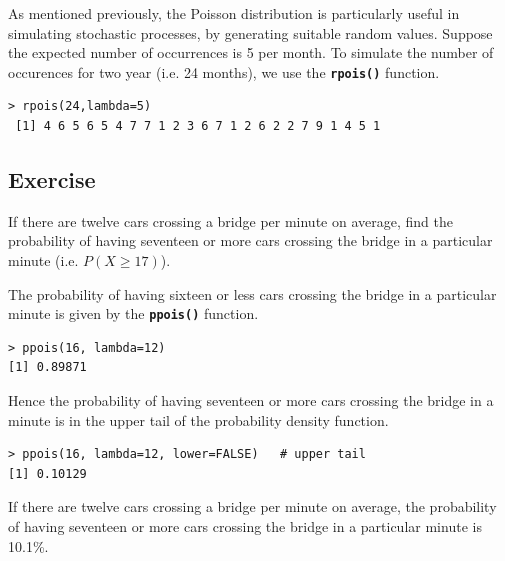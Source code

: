 \documentclass[a4paper,12pt]{article}
\begin{document}
As mentioned previously, the Poisson distribution is particularly useful in simulating stochastic processes, by generating suitable random values.
Suppose the expected number of occurrences is 5 per month. To simulate the number of occurences for two year (i.e. 24 months), we use the \texttt{\textbf{rpois()}} function.

\begin{verbatim}
> rpois(24,lambda=5)
 [1] 4 6 5 6 5 4 7 7 1 2 3 6 7 1 2 6 2 2 7 9 1 4 5 1
\end{verbatim}

\subsection{Exercise}

If there are twelve cars crossing a bridge per minute on average, find the probability of having seventeen or more cars crossing the bridge in a particular minute (i.e. $P(X\geq 17)$). 

The probability of having sixteen or less cars crossing the bridge in a particular minute is given by the  \texttt{\textbf{ppois()}} function. 
\begin{verbatim}
> ppois(16, lambda=12)   
[1] 0.89871 
\end{verbatim}

Hence the probability of having seventeen or more cars crossing the bridge in a minute is in the upper tail of the probability density function. 
\begin{verbatim}
> ppois(16, lambda=12, lower=FALSE)   # upper tail 
[1] 0.10129 
\end{verbatim}

If there are twelve cars crossing a bridge per minute on average, the probability of having seventeen or more cars crossing the bridge in a particular minute is 10.1\%. 







\end{document}
